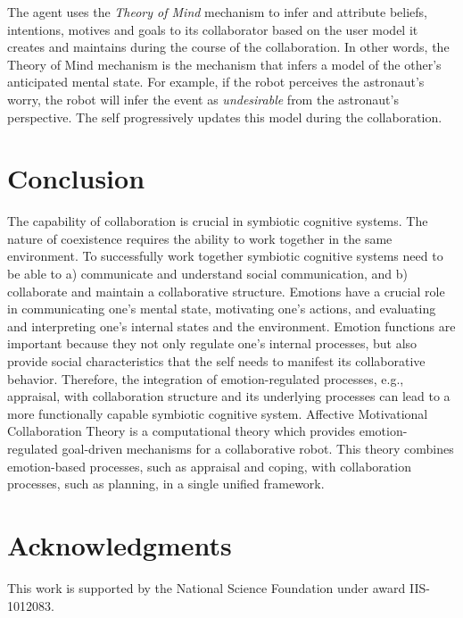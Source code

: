 \documentclass[letterpaper]{article}
\begin{document}
The agent uses the \textit{Theory of Mind} mechanism to infer and attribute
beliefs, intentions, motives and goals to its collaborator based on the user
model it creates and maintains during the course of the collaboration. In
other words, the Theory of Mind mechanism is the mechanism that infers a model
of the other's anticipated mental state. For example, if the robot perceives
the astronaut's worry, the robot will infer the event as \textit{undesirable}
from the astronaut's perspective. The self progressively updates this model
during the collaboration.

\section{Conclusion}
The capability of collaboration is crucial in symbiotic cognitive systems. The
nature of coexistence requires the ability to work together in the same
environment. To successfully work together symbiotic cognitive systems need to
be able to a) communicate and understand social communication, and b)
collaborate and maintain a collaborative structure. Emotions have a crucial role
in communicating one's mental state, motivating one's actions, and evaluating
and interpreting one's internal states and the environment. Emotion functions
are important because they not only regulate one's internal processes, but also
provide social characteristics that the self needs to manifest its collaborative
behavior. Therefore, the integration of emotion-regulated processes, e.g.,
appraisal, with collaboration structure and its underlying processes can lead to
a more functionally capable symbiotic cognitive system. Affective Motivational
Collaboration Theory is a computational theory which provides emotion-regulated
goal-driven mechanisms for a collaborative robot. This theory combines
emotion-based processes, such as appraisal and coping, with collaboration
processes, such as planning, in a single unified framework.

\section*{Acknowledgments}
This work is supported by the National Science Foundation under award
IIS-1012083.



\end{document}

